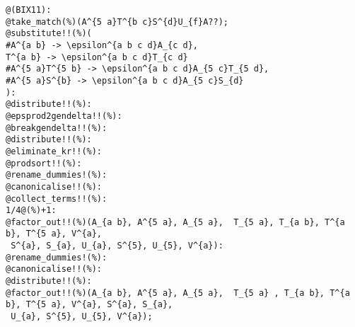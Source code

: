 \documentclass[11pt]{article}
\begin{document}
{\color[named]{Blue}\begin{verbatim}
@(BIX11):
@take_match(%)(A^{5 a}T^{b c}S^{d}U_{f}A??);
@substitute!!(%)(
#A^{a b} -> \epsilon^{a b c d}A_{c d},
T^{a b} -> \epsilon^{a b c d}T_{c d}
#A^{5 a}T^{5 b} -> \epsilon^{a b c d}A_{5 c}T_{5 d},
#A^{5 a}S^{b} -> \epsilon^{a b c d}A_{5 c}S_{d}
):
@distribute!!(%):
@epsprod2gendelta!!(%):
@breakgendelta!!(%):
@distribute!!(%):
@eliminate_kr!!(%):
@prodsort!!(%):
@rename_dummies!(%):
@canonicalise!!(%):
@collect_terms!!(%):
1/4@(%)+1:
@factor_out!!(%)(A_{a b}, A^{5 a}, A_{5 a},  T_{5 a}, T_{a b}, T^{a b}, T^{5 a}, V^{a},
 S^{a}, S_{a}, U_{a}, S^{5}, U_{5}, V^{a}):
@rename_dummies!(%):
@canonicalise!!(%):
@distribute!!(%):
@factor_out!!(%)(A_{a b}, A^{5 a}, A_{5 a},  T_{5 a} , T_{a b}, T^{a b}, T^{5 a}, V^{a}, S^{a}, S_{a},
 U_{a}, S^{5}, U_{5}, V^{a});
\end{verbatim}}
\end{document}
